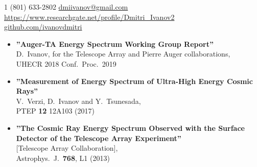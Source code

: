 \documentclass[12pt,letterpaper]{article} %
\begin{document}


\noindent\textsmaller{+}1 (801) 633-2802\bull
\href{mailto:dmiivanov@gmail.com}{dmiivanov@gmail.com}\bull
\href{https://www.researchgate.net/profile/Dmitri\_Ivanov2}
{https://www.researchgate.net/profile/Dmitri\_Ivanov2}\\\bull
\href{https://github.com/ivanovdmitri}
{github.com/ivanovdmitri}

\spacedhrule{0.9em}{-0.2em}

{
	\begin{itemize}
		\item {\bf ''Auger-TA Energy Spectrum Working Group Report''}
		\\{}D.~Ivanov, for the Telescope Array and Pierre Auger collaborations,
		\\{}UHECR 2018 Conf.\ Proc.\ 2019
		
		\item {\bf ''Measurement of Energy Spectrum of Ultra-High Energy Cosmic Rays''}
		\\{}V.~Verzi, D.~Ivanov and Y.~Tsunesada,
		\\{}PTEP {\bf 12} 12A103 (2017)
		
		\item {\bf ''The Cosmic Ray Energy Spectrum Observed with the Surface Detector of the Telescope Array Experiment''}
		\\{}[Telescope Array Collaboration],
		\\{}Astrophys.\ J.\  {\bf 768}, L1 (2013)
	\end{itemize}
}
\end{document}
